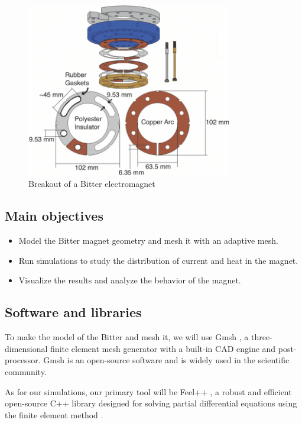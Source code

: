 \documentclass[12pt]{article}
\begin{document}
\begin{figure}[H]
  \centering
  \includegraphics[width=0.8\textwidth]{images/Bitter-electromagnet-breakout.png}
  \caption{Breakout of a Bitter electromagnet \cite{bitter_breakout}}
\end{figure}

\subsection{Main objectives}

\begin{itemize}
  \item Model the Bitter magnet geometry and mesh it with an adaptive mesh.
  \item Run simulations to study the distribution of current and heat in the magnet.
  \item Visualize the results and analyze the behavior of the magnet.
\end{itemize}

\subsection{Software and libraries}
To make the model of the Bitter and mesh it, we will use Gmsh \cite{geuzaine_gmsh_2009}, a three-dimensional
finite element mesh generator with a built-in CAD engine and post-processor.
Gmsh is an open-source software and is widely used in the scientific
community.

As for our simulations, our primary tool will be Feel++ \cite{christophe_prudhomme_feelppfeelpp_2024}, a robust and
efficient open-source C++ library designed for solving partial differential equations using
the finite element method \cite{fem}.
\end{document}
